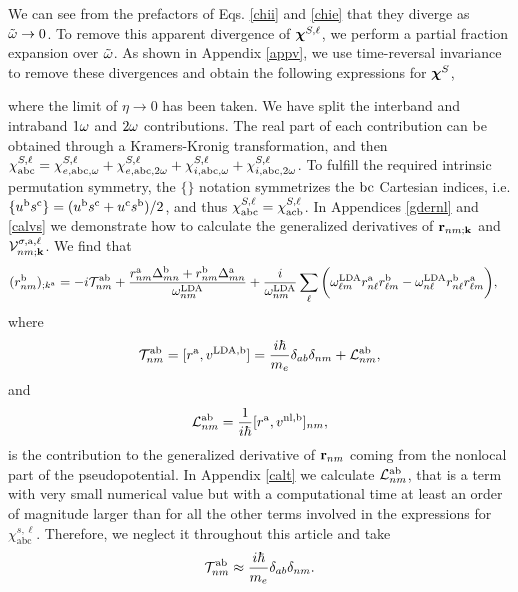 \documentclass[floatfix,prb,aps,superscriptaddress,11pt,preprint,letterpaper]{revtex4}
\begin{document}
We can see from the prefactors of Eqs. \eqref{chii} and \eqref{chie} 
that they diverge as $\tilde\omega\to 0$. To remove this apparent divergence of 
$\boldsymbol{\chi}^{S,\ell}$, we perform a partial fraction expansion over $\tilde\omega$. 
As shown in Appendix \ref{appv}, we use time-reversal invariance to 
remove these divergences and obtain the following expressions for $\boldsymbol{\chi}^S$,

\noindent where the limit of $\eta\to 0$ has been taken.
We have split the interband and intraband $1\omega$ and $2\omega$
contributions. The real part of each contribution can be obtained through
a Kramers-Kronig transformation,\cite{nicolas} and then
$\chi^{S,\ell}_{\mathrm{a}\mathrm{b}\mathrm{c}}=\chi^{S,\ell}_{e,\mathrm{a}\mathrm{b}\mathrm{c},\omega} 
+\chi^{S,\ell}_{e,\mathrm{a}\mathrm{b}\mathrm{c},2\omega}+\chi^{S,\ell}_{i,\mathrm{a}\mathrm{b}\mathrm{c},\omega}
+\chi^{S,\ell}_{i,\mathrm{a}\mathrm{b}\mathrm{c},2\omega}
$.
To fulfill the required intrinsic permutation symmetry,\cite{rashkeevPRB98} 
the $\{\}$ notation symmetrizes the $\mathrm{b}\mathrm{c}$ Cartesian indices, i.e. 
$\{u^{\mathrm{b}}s^{\mathrm{c}}\}=(u^{\mathrm{b}}s^{\mathrm{c}}+u^{\mathrm{c}}s^{\mathrm{b}})/2$,
and thus
$\chi_{\mathrm{a}\mathrm{b}\mathrm{c}}^{S,\ell}=\chi_{\mathrm{a}\mathrm{c}\mathrm{b}}^{S,\ell}$.
In Appendices \ref{gdernl} and \ref{calvs} we demonstrate how to calculate  
the generalized derivatives of $\mathbf{r}_{nm;\mathbf{k}}$ and
${\mathbf{\cal V}}^{\sigma,\mathrm{a},\ell}_{nm;\mathbf{k}}$. 
We find that
\begin{align}\label{rgen.69}
(r^{\mathrm{b}}_{nm})_{;k^{\mathrm{a}}}
&=
-i{\cal T}^{\mathrm{a}\mathrm{b}}_{nm}
+
\frac{
r^{\mathrm{a}}_{nm}
\Delta^{\mathrm{b}}_{mn}
+r^{\mathrm{b}}_{nm}
\Delta^{\mathrm{a}}_{mn}
}
{\omega^{\mathrm{LDA}}_{nm}}
+
\frac{i}{\omega^{\mathrm{LDA}}_{nm}}
\sum_{\ell}
\bigg(
\omega^{\mathrm{LDA}}_{\ell m}
r^{\mathrm{a}}_{n\ell}
r^{\mathrm{b}}_{\ell m}
-
\omega^{\mathrm{LDA}}_{n\ell}
r^{\mathrm{b}}_{n\ell}
r^{\mathrm{a}}_{\ell m}
\bigg)
,
\end{align}
where
\begin{align}\label{tau.1}
{\cal T}_{nm}^{\mathrm{a}\mathrm{b}}
=
[r^{\mathrm{a}},v^{\mathrm{LDA},\mathrm{b}}]= 
\frac{i\hbar}{m_e}\delta_{ab}\delta_{nm}+
{\cal L}_{nm}^{\mathrm{a}\mathrm{b}}
,
\end{align}  
and
\begin{align}\label{tau.2}
{\cal L}_{nm}^{\mathrm{a}\mathrm{b}}
=
\frac{1}{i\hbar}[r^{\mathrm{a}},v^{\mathrm{nl},\mathrm{b}}]_{nm}
,
\end{align}
is the contribution to the generalized derivative of $\mathbf{r}_{nm}$
coming from the nonlocal part of the pseudopotential.
In Appendix \ref{calt} we calculate
${\cal L}^{\mathrm{a}\mathrm{b}}_{nm}$, that
is a term with very small numerical value but with a computational time 
at least an order of magnitude larger
than for all the other terms involved in the expressions for 
$\chi^{s,\ell}_{\mathrm{abc}}$.\cite{valerie}
Therefore, we neglect it throughout this article and take
\begin{align}\label{tau.69}
{\cal T}_{nm}^{\mathrm{a}\mathrm{b}}
\approx
\frac{i\hbar}{m_e}\delta_{ab}\delta_{nm}
.
\end{align} 
\end{document}
